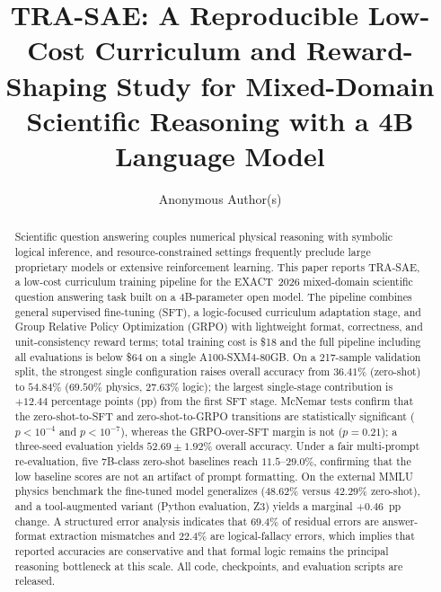 \documentclass[preprint,12pt]{elsarticle}
\newcommand{\modelname}{\textsc{TRA-SAE}}
\newcommand{\dataset}{EXACT~2026}
\begin{document}
\begin{frontmatter}

\title{\modelname{}: A Reproducible Low-Cost Curriculum and
       Reward-Shaping Study for Mixed-Domain Scientific Reasoning
       with a 4B Language Model}

\author[inst1]{Anonymous Author(s)}

\begin{abstract}
Scientific question answering couples numerical physical reasoning with
symbolic logical inference, and resource-constrained settings frequently
preclude large proprietary models or extensive reinforcement learning.
This paper reports \modelname{}, a low-cost curriculum training pipeline
for the \dataset{} mixed-domain scientific question answering task built
on a 4B-parameter open model. The pipeline combines general supervised
fine-tuning (SFT), a logic-focused curriculum adaptation stage, and Group
Relative Policy Optimization (GRPO) with lightweight format, correctness,
and unit-consistency reward terms; total training cost is \$18 and the full
pipeline including all evaluations is below \$64 on a single
A100-SXM4-80GB. On a 217-sample validation split, the strongest single
configuration raises overall accuracy from $36.41\%$ (zero-shot) to
$54.84\%$ ($69.50\%$ physics, $27.63\%$ logic); the largest single-stage
contribution is $+12.44$ percentage points (pp) from the first SFT stage.
McNemar tests confirm that the zero-shot-to-SFT and zero-shot-to-GRPO
transitions are statistically significant ($p<10^{-4}$ and $p<10^{-7}$),
whereas the GRPO-over-SFT margin is not ($p=0.21$); a three-seed evaluation
yields $52.69\pm1.92\%$ overall accuracy. Under a fair multi-prompt
re-evaluation, five 7B-class zero-shot baselines reach $11.5$--$29.0\%$,
confirming that the low baseline scores are not an artifact of prompt
formatting. On the external MMLU physics benchmark the fine-tuned model
generalizes ($48.62\%$ versus $42.29\%$ zero-shot), and a tool-augmented
variant (Python evaluation, Z3) yields a marginal $+0.46$~pp change. A
structured error analysis indicates that $69.4\%$ of residual errors are
answer-format extraction mismatches and $22.4\%$ are logical-fallacy
errors, which implies that reported accuracies are conservative and that
formal logic remains the principal reasoning bottleneck at this scale.
All code, checkpoints, and evaluation scripts are released.
\end{abstract}


\end{frontmatter}
\end{document}
